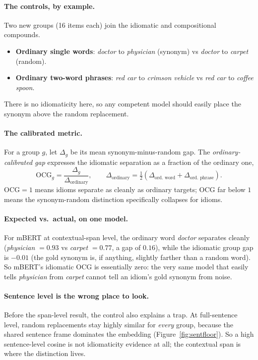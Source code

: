\documentclass[11pt]{article}
\begin{document}
\paragraph{The controls, by example.} Two new groups (16 items each) join the idiomatic and
compositional compounds.
\begin{itemize}
  \item \textbf{Ordinary single words}: \emph{doctor} to \emph{physician} (synonym) vs \emph{doctor}
  to \emph{carpet} (random).
  \item \textbf{Ordinary two-word phrases}: \emph{red car} to \emph{crimson vehicle} vs \emph{red
  car} to \emph{coffee spoon}.
\end{itemize}
There is no idiomaticity here, so any competent model should easily place the synonym above the
random replacement.

\paragraph{The calibrated metric.} For a group $g$, let $\Delta_g$ be its mean synonym-minus-random
gap. The \emph{ordinary-calibrated gap} expresses the idiomatic separation as a fraction of the
ordinary one,
\[
\mathrm{OCG}_g = \frac{\Delta_g}{\Delta_{\mathrm{ordinary}}},\qquad
\Delta_{\mathrm{ordinary}}=\tfrac12(\Delta_{\text{ord.\ word}}+\Delta_{\text{ord.\ phrase}}).
\]
$\mathrm{OCG}=1$ means idioms separate as cleanly as ordinary targets; $\mathrm{OCG}$ far below $1$
means the synonym-random distinction specifically collapses for idioms.

\paragraph{Expected vs.\ actual, on one model.} For mBERT at contextual-span level, the ordinary word
\emph{doctor} separates cleanly (\emph{physician} $=0.93$ vs \emph{carpet} $=0.77$, a gap of $0.16$),
while the idiomatic group gap is $-0.01$ (the gold synonym is, if anything, slightly farther than a
random word). So mBERT's idiomatic OCG is essentially zero: the very same model that easily tells
\emph{physician} from \emph{carpet} cannot tell an idiom's gold synonym from noise.

\paragraph{Sentence level is the wrong place to look.} Before the span-level result, the control also
explains a trap. At full-sentence level, random replacements stay highly similar for \emph{every}
group, because the shared sentence frame dominates the embedding (Figure~\ref{fig:sentfloor}). So a
high sentence-level cosine is not idiomaticity evidence at all; the contextual span is where the
distinction lives.
\end{document}
